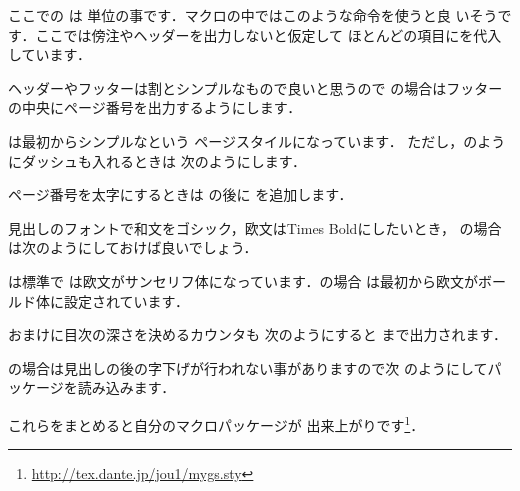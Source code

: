 ここでの  は
単位の事です．マクロの中ではこのような命令を使うと良
いそうです．ここでは傍注やヘッダーを出力しないと仮定して
ほとんどの項目に\qu{0pt}を代入しています．

ヘッダーやフッターは割とシンプルなもので良いと思うので
の場合はフッターの中央にページ番号を出力するようにします．

\begin{InTeX}
\pagestyle{plainfoot}
\end{InTeX}

は最初からシンプルなという
ページスタイルになっています．
ただし，のようにダッシュも入れるときは
次のようにします．

%
%
%
\begin{InTeX}
 \let\@mkboth\@gobbletwo
 \let\@oddhead\@empty
 \let\@evenhead\@empty
 \def\@oddfoot{\normalfont\hfil-- \thepage\ --\hfil}%
 \let\@evenfoot\@oddfoot
 \setlength{}%
\end{InTeX}

ページ番号を太字にするときは 
の後に を追加します．

見出しのフォントで和文をゴシック，欧文はTimes Boldにしたいとき，
の場合は次のようにしておけば良いでしょう．

\begin{InTeX}
\renewcommand{\headfont}{\gtfamily\rmfamily\bfseries}
\end{InTeX}

は標準で
は欧文がサンセリフ体になっています．の場合
は最初から欧文がボールド体に設定されています．

おまけに目次の深さを決めるカウンタも
次のようにすると  まで出力されます．

\begin{InTeX}
\setcounter{tocdepth}{2}
\end{InTeX}


の場合は見出しの後の字下げが行われない事がありますので次
のようにしてパッケージを読み込みます．

\begin{InTeX}
\RequirePackage{indentfirst} 
\end{InTeX}


これらをまとめると自分のマクロパッケージが
出来上がりです\footnote{\url{http://tex.dante.jp/jou1/mygs.sty}}．

